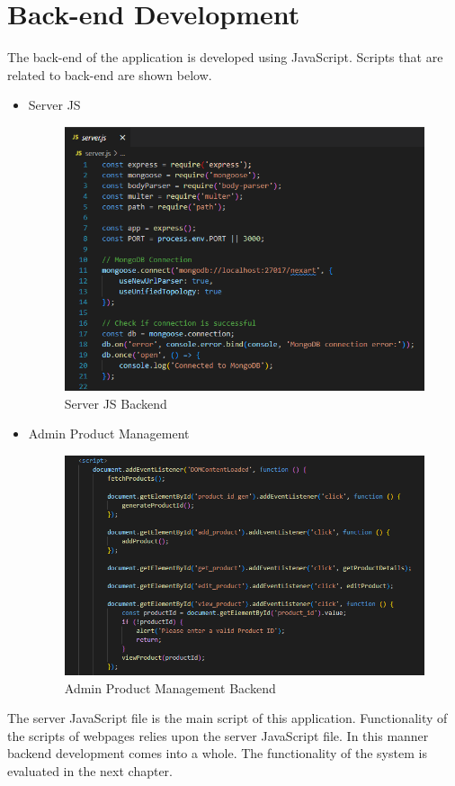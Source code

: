 \documentclass[a4Paper,12pt]{report}
\begin{document}
\section{Back-end Development}
The back-end of the application is developed using JavaScript. Scripts that are related to back-end are shown below.
\begin{itemize}
\item Server JS
\begin{figure}[H]
\centering
\includegraphics[scale=0.5]{images/server_js_backend.png}
\caption{Server JS Backend}
\end{figure}
\item Admin Product Management
\begin{figure}[H]
\centering
\includegraphics[scale=0.5]{images/admin_product_management_backend.png}
\caption{Admin Product Management Backend}
\end{figure}
\end{itemize}
The server JavaScript file is the main script of this application. Functionality of the scripts of webpages relies upon the server JavaScript file. In this manner backend development comes into a whole. The functionality of the system is evaluated in the next chapter.
\end{document}
